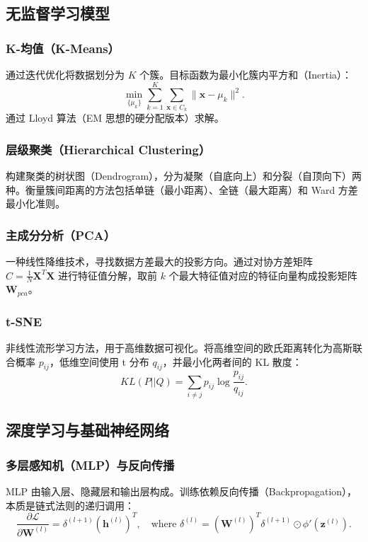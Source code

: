 \documentclass[12pt,a4paper]{ctexart}
\begin{document}
\subsection{无监督学习模型}

\subsubsection{K-均值（K-Means）}
通过迭代优化将数据划分为 $K$ 个簇。目标函数为最小化簇内平方和（Inertia）：
\begin{equation}
    \min_{\{\mu_k\}} \sum_{k=1}^K \sum_{\mathbf{x} \in C_k} \|\mathbf{x} - \mu_k\|^2.
\end{equation}
通过 Lloyd 算法（EM 思想的硬分配版本）求解。

\subsubsection{层级聚类（Hierarchical Clustering）}
构建聚类的树状图（Dendrogram），分为凝聚（自底向上）和分裂（自顶向下）两种。衡量簇间距离的方法包括单链（最小距离）、全链（最大距离）和 Ward 方差最小化准则。

\subsubsection{主成分分析（PCA）}
一种线性降维技术，寻找数据方差最大的投影方向。通过对协方差矩阵 $C = \frac{1}{N} \mathbf{X}^T \mathbf{X}$ 进行特征值分解，取前 $k$ 个最大特征值对应的特征向量构成投影矩阵 $\mathbf{W}_{pca}$。

\subsubsection{t-SNE}
非线性流形学习方法，用于高维数据可视化。将高维空间的欧氏距离转化为高斯联合概率 $p_{ij}$，低维空间使用 t 分布 $q_{ij}$，并最小化两者间的 KL 散度：
\begin{equation}
    KL(P||Q) = \sum_{i \neq j} p_{ij} \log \frac{p_{ij}}{q_{ij}}.
\end{equation}

\subsection{深度学习与基础神经网络}

\subsubsection{多层感知机（MLP）与反向传播}
MLP 由输入层、隐藏层和输出层构成。训练依赖反向传播（Backpropagation），本质是链式法则的递归调用：
\begin{equation}
    \frac{\partial \mathcal{L}}{\partial \mathbf{W}^{(l)}} = \delta^{(l+1)} (\mathbf{h}^{(l)})^T, \quad \text{where } \delta^{(l)} = (\mathbf{W}^{(l)})^T \delta^{(l+1)} \odot \phi'(\mathbf{z}^{(l)}).
\end{equation}
\end{document}
